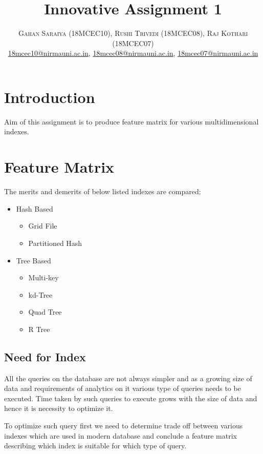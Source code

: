 \documentclass[paper=letter, fontsize=12pt]{article}
\title{\vspace{-15mm}\fontsize{24pt}{10pt}\selectfont\textbf{Innovative Assignment 1}} %
\author{
\large
{\textsc{Gahan Saraiya (18MCEC10), Rushi Trivedi (18MCEC08), Raj Kothari (18MCEC07)}}\\[2mm]
\normalsize \href{mailto:18mcec10@nirmauni.ac.in}{18mcec10@nirmauni.ac.in}, %
\normalsize \href{mailto:18mcec10@nirmauni.ac.in}{18mcec08@nirmauni.ac.in}, %
\normalsize \href{mailto:18mcec10@nirmauni.ac.in}{18mcec07@nirmauni.ac.in}\\[2mm] %
}
\date{}
\begin{document}
\maketitle %
\thispagestyle{fancy} %

\newcommand*\tick{\item[\Checkmark]}
\newcommand*\good{\CheckmarkBold}
\newcommand*\arrow{\item[$\Rightarrow$]}
\newcommand*\fail{\item[\XSolidBrush]}
\newcommand*\bad{\XSolidBrush}

\section{Introduction}
Aim of this assignment is to produce feature matrix for various multidimensional indexes.
\section{Feature Matrix}
The merits and demerits of below listed indexes are compared:
\begin{itemize}
	\item Hash Based
		\begin{itemize}
			\item Grid File
			\item Partitioned Hash
		\end{itemize}
	\item Tree Based
		\begin{itemize}
			\item Multi-key
			\item kd-Tree
			\item Quad Tree
			\item R Tree
		\end{itemize}
\end{itemize}

\subsection{Need for Index}
All the queries on the database are not always simpler and as a growing size of data and requirements of analytics on it various type of queries needs to be executed. Time taken by such queries to execute grows with the size of data and hence it is necessity to optimize it.

To optimize such query first we need to determine trade off between various indexes which are used in modern database and conclude a feature matrix describing which index is suitable for which type of query.
\end{document}
